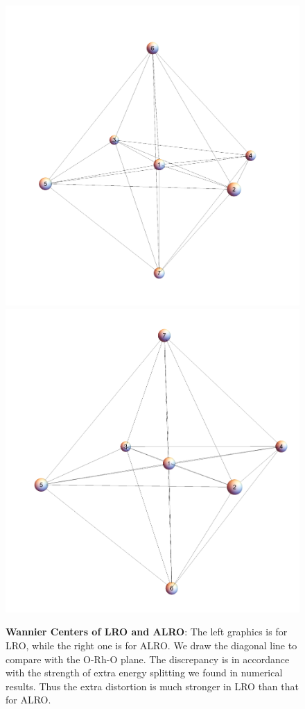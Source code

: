 \documentclass[10pt,nofootinbib,letterpaper]{revtex4}
\begin{document}
		\begin{figure}[!htp]
			\centering
			\includegraphics[scale=0.3]{LRO.pdf}
			\includegraphics[scale=0.28]{ALRO.pdf}
			\caption{{\bf Wannier Centers of LRO and ALRO}: The left graphics is for LRO, while the right one is for ALRO. We draw the diagonal line to compare with the $\mathrm{O}$-$\mathrm{Rh}$-$\mathrm{O}$ plane. The discrepancy is in accordance with the strength of extra energy splitting we found in numerical results. Thus the extra distortion is much stronger in LRO than that for ALRO.}
			\label{fig:wannier}
		\end{figure}
\end{document}
